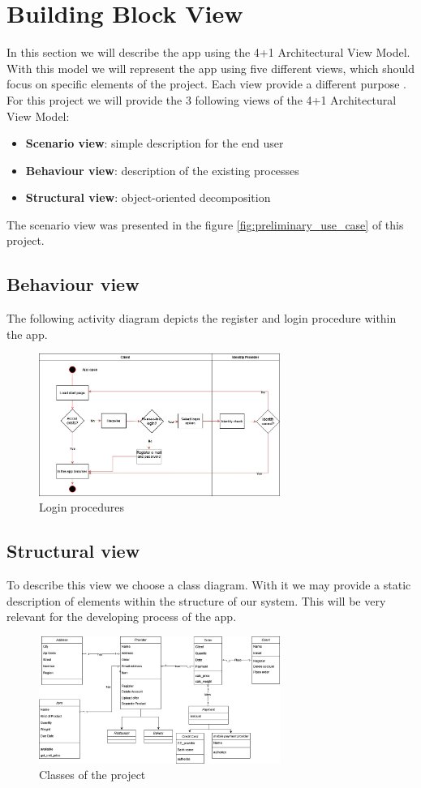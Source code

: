 \section{Building Block View}

In this section we will describe the \gls{app} using the 4+1 Architectural View Model. With this model we will represent
the \gls{app} using five different views, which should focus on specific elements of the project. Each view provide
a different purpose \cite{refart:KR41}. For this project we will provide the 3 following views of the 4+1 Architectural View 
Model:

\begin{itemize}
    \item \textbf{Scenario view}: simple description for the end user 
    \item \textbf{Behaviour view}: description of the existing processes
    \item \textbf{Structural view}: object-oriented decomposition
\end{itemize}

The scenario view was presented in the figure \ref{fig:preliminary_use_case} of this project.

\subsection{Behaviour view}
The following \gls{activity diagram} depicts the register and login procedure within the app.

\begin{figure}[H]
    \centering
    \includegraphics[width=0.7\textwidth]{assets/login_AC.jpg}
    \caption{Login procedures}
    \label{fig:login_register}
\end{figure}

\subsection{Structural view}
To describe this view we choose a \gls{class diagram}. With it we may provide a static description of elements
within the structure of our system. This will be very relevant for the developing process of the \gls{app}.

\begin{figure}[H]
    \centering
    \includegraphics[width=0.7\textwidth]{assets/classes_CD.jpg}
    \caption{Classes of the project}
    \label{fig:class_CD}
\end{figure}
 
